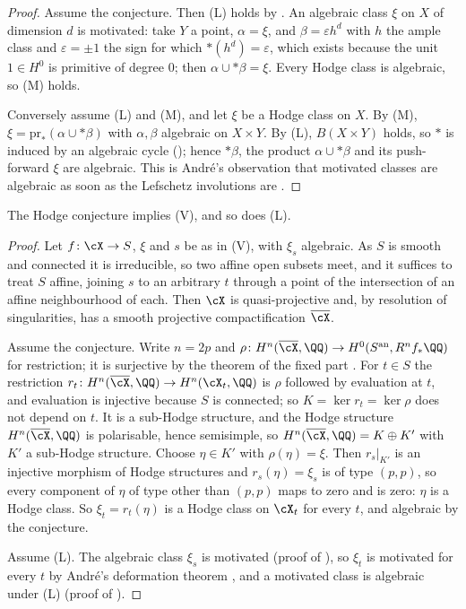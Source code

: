 \begin{proof}
Assume the conjecture. Then \textup{(L)} holds by . An
algebraic class $\xi$ on $X$ of dimension $d$ is motivated: take $Y$ a point,
$\alpha=\xi$, and $\beta=\varepsilon h^{d}$ with $h$ the ample class and
$\varepsilon=\pm1$ the sign for which ${*}(h^{d})=\varepsilon$, which exists
because the unit $1\in H^{0}$ is primitive of degree $0$; then
$\alpha\cup{*}\beta=\xi$. Every Hodge class is algebraic, so \textup{(M)}
holds.

Conversely assume \textup{(L)} and \textup{(M)}, and let $\xi$ be a Hodge
class on $X$. By \textup{(M)}, $\xi=\mathrm{pr}_{*}(\alpha\cup{*}\beta)$ with
$\alpha,\beta$ algebraic on $X\times Y$. By \textup{(L)}, $B(X\times Y)$
holds, so ${*}$ is induced by an algebraic cycle
(); hence ${*}\beta$, the product
$\alpha\cup{*}\beta$ and its push-forward $\xi$ are algebraic. This is
Andr\'e's observation that motivated classes are algebraic as soon as the
Lefschetz involutions are \cite[\S2.1]{And96b}.
\end{proof}

\begin{proposition}\label{prop:lefvhc}
The Hodge conjecture implies \textup{(V)}, and so does \textup{(L)}.
\end{proposition}

\begin{proof}
Let $f\colon\cX\to S$, $\xi$ and $s$ be as in \textup{(V)}, with $\xi_{s}$
algebraic. As $S$ is smooth and connected it is irreducible, so two affine
open subsets meet, and it suffices to treat $S$ affine, joining $s$ to an
arbitrary $t$ through a point of the intersection of an affine neighbourhood
of each. Then $\cX$ is quasi-projective and, by resolution of singularities,
has a smooth projective compactification $\overline{\cX}$.

Assume the conjecture. Write $n=2p$ and
$\rho\colon H^{n}(\overline{\cX},\QQ)\to H^{0}(S^{\mathrm{an}},R^{n}f_{*}\QQ)$
for restriction; it is surjective by the theorem of the fixed part
\cite[4.1.1(ii)]{Del71}. For $t\in S$ the restriction
$r_{t}\colon H^{n}(\overline{\cX},\QQ)\to H^{n}(\cX_{t},\QQ)$ is $\rho$
followed by evaluation at $t$, and evaluation is injective because $S$ is
connected; so $K=\ker r_{t}=\ker\rho$ does not depend on $t$. It is a
sub-Hodge structure, and the Hodge structure $H^{n}(\overline{\cX},\QQ)$ is
polarisable, hence semisimple, so $H^{n}(\overline{\cX},\QQ)=K\oplus K'$
with $K'$ a sub-Hodge structure. Choose $\eta\in K'$ with $\rho(\eta)=\xi$.
Then $r_{s}|_{K'}$ is an injective morphism of Hodge structures and
$r_{s}(\eta)=\xi_{s}$ is of type $(p,p)$, so every component of $\eta$ of
type other than $(p,p)$ maps to zero and is zero: $\eta$ is a Hodge class.
So $\xi_{t}=r_{t}(\eta)$ is a Hodge class on $\cX_{t}$ for every $t$, and
algebraic by the conjecture.

Assume \textup{(L)}. The algebraic class $\xi_{s}$ is motivated (proof of
), so $\xi_{t}$ is motivated for every $t$ by Andr\'e's
deformation theorem \cite[Th\'eor\`eme~0.5]{And96b}, and a motivated class is
algebraic under \textup{(L)} (proof of ).
\end{proof}

